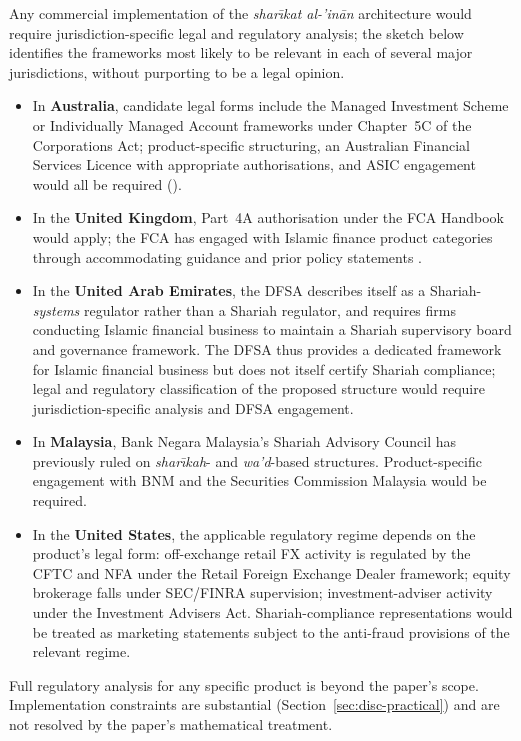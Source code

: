 \documentclass[preprint,12pt,authoryear]{elsarticle}
\theoremstyle{definition}
\begin{document}
Any commercial implementation of the
\emph{shar\={\i}kat al-'in\={a}n} architecture would require
jurisdiction-specific legal and regulatory analysis; the
sketch below identifies the frameworks most likely to be
relevant in each of several major jurisdictions, without
purporting to be a legal opinion.
\begin{itemize}
    \item In \textbf{Australia}, candidate legal forms include
    the Managed Investment Scheme or Individually Managed
    Account frameworks under Chapter~5C of the Corporations
    Act; product-specific structuring, an Australian Financial
    Services Licence with appropriate authorisations, and
    ASIC engagement would all be required
    (\citealp{ASIC2020}).
    \item In the \textbf{United Kingdom}, Part~4A authorisation
    under the FCA Handbook would apply; the FCA has engaged
    with Islamic finance product categories through
    accommodating guidance and prior policy statements
    \citep{FCA2022}.
    \item In the \textbf{United Arab Emirates}, the DFSA
    describes itself as a Shariah-\emph{systems} regulator
    rather than a Shariah regulator, and requires firms
    conducting Islamic financial business to maintain a
    Shariah supervisory board and governance framework. The
    DFSA thus provides a dedicated framework for Islamic
    financial business but does not itself certify Shariah
    compliance; legal and regulatory classification of the
    proposed structure would require jurisdiction-specific
    analysis and DFSA engagement.
    \item In \textbf{Malaysia}, Bank Negara Malaysia's Shariah
    Advisory Council has previously ruled on
    \emph{shar\={\i}kah}- and \emph{wa'd}-based structures.
    Product-specific engagement with BNM and the Securities
    Commission Malaysia would be required.
    \item In the \textbf{United States}, the applicable
    regulatory regime depends on the product's legal form:
    off-exchange retail FX activity is regulated by the CFTC
    and NFA under the Retail Foreign Exchange Dealer
    framework; equity brokerage falls under SEC/FINRA
    supervision; investment-adviser activity under the
    Investment Advisers Act. Shariah-compliance
    representations would be treated as marketing statements
    subject to the anti-fraud provisions of the relevant
    regime.
\end{itemize}
Full regulatory analysis for any specific product is beyond
the paper's scope. Implementation constraints are substantial
(Section~\ref{sec:disc-practical}) and are not resolved by the
paper's mathematical treatment.
\end{document}

